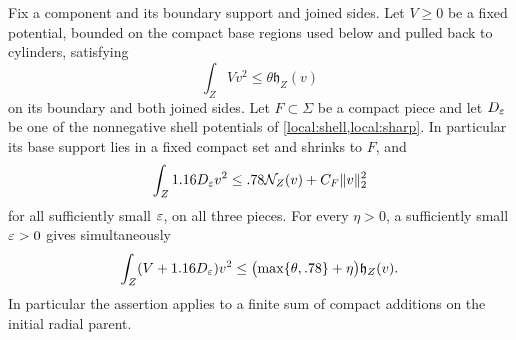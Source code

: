 \begin{lemma}\label{enlargement:maximum}
Fix a component and its boundary support and joined sides. Let $V\ge0$ be
a fixed potential, bounded on the compact base regions used below
and pulled back to cylinders, satisfying
\begin{equation}\label{enlargement:old-bound}
 \int_Z Vv^2\le\theta\mathfrak h_Z(v)
\end{equation}
on its boundary and both joined sides.  Let $F\subset\Sigma$ be a compact
piece and let $D_\varepsilon$ be one of the nonnegative shell
potentials of \cref{local:shell,local:sharp}.  In particular its base
support lies in a fixed compact set and shrinks to $F$, and
\begin{equation}\label{enlargement:local-input}
 \int_Z1.16D_\varepsilon v^2\le .78\mathcal N_Z(v)+C_F\lVert v\rVert_2^2
\end{equation}
for all sufficiently small $\varepsilon$, on all three pieces.
For every $\eta>0$, a sufficiently small $\varepsilon>0$ gives simultaneously
\begin{equation}\label{enlargement:maximum-bound}
 \int_Z(V+1.16D_\varepsilon)v^2
 \le\bigl(\max\{\theta,.78\}+\eta\bigr)\mathfrak h_Z(v).
\end{equation}
In particular the assertion applies to a finite sum of compact
additions on the initial radial parent.
\end{lemma}

